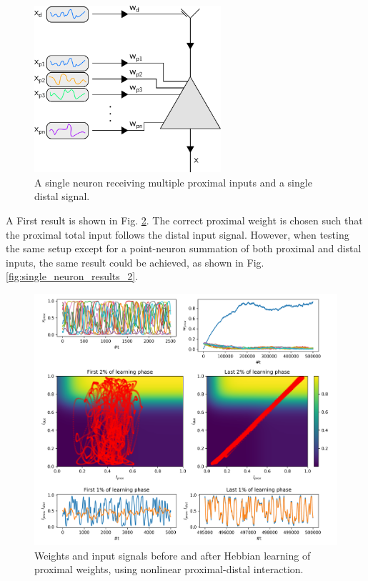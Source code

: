 \documentclass[10pt,a4paper]{article}
\begin{document}
\begin{figure}
\centering
\includegraphics[width=6.91cm]{./figures/single_neuron_illustration.png}
\caption{A single neuron receiving multiple proximal inputs and a single distal signal.}
\label{fig:single_neuron_illustration}
\end{figure}

A First result is shown in Fig. \ref{fig:single_neuron_results_1}. The correct proximal weight is chosen such that the proximal total input follows the distal input signal. However, when testing the same setup except for a point-neuron summation of both proximal and distal inputs, the same result could be achieved, as shown in Fig. \ref{fig:single_neuron_results_2}. 

\begin{figure}
\centering
\includegraphics[width=\textwidth]{./figures/single_neuron_results_1.png}
\caption{Weights and input signals before and after Hebbian learning of proximal weights, using nonlinear proximal-distal interaction.}
\label{fig:single_neuron_results_1}
\end{figure}
\end{document}
